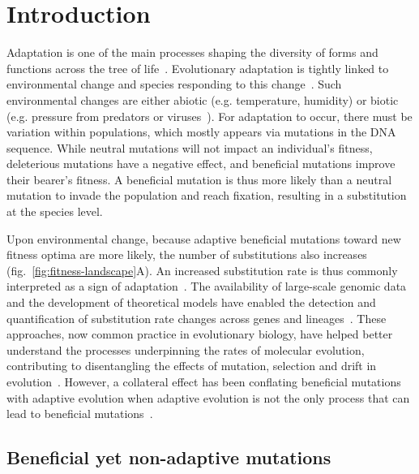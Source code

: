 \documentclass{article}
\begin{document}
    \section*{Introduction}
    Adaptation is one of the main processes shaping the diversity of forms and functions across the tree of life~\cite{darwin_origin_1859}.
    Evolutionary adaptation is tightly linked to environmental change and species responding to this change~\cite{merrell_adaptive_1994, gavrilets_adaptive_2009}.
    Such environmental changes are either abiotic (e.g. temperature, humidity) or biotic (e.g. pressure from predators or viruses~\cite{enard_viruses_2016}).
    For adaptation to occur, there must be variation within populations, which mostly appears via mutations in the DNA sequence.
    While neutral mutations will not impact an individual's fitness, deleterious mutations have a negative effect, and beneficial mutations improve their bearer's fitness.
    A beneficial mutation is thus more likely than a neutral mutation to invade the population and reach fixation, resulting in a substitution at the species level.

    Upon environmental change, because adaptive beneficial mutations toward new fitness optima are more likely, the number of substitutions also increases (fig.~\ref{fig:fitness-landscape}A).
    An increased substitution rate is thus commonly interpreted as a sign of adaptation~\cite{mcdonald_adaptative_1991, smith_adaptive_2002, welch_estimating_2006}.
    The availability of large-scale genomic data and the development of theoretical models have enabled the detection and quantification of substitution rate changes across genes and lineages~\cite{yang_statistical_2000, eyre-walker_genomic_2006, moutinho_variation_2019}.
    These approaches, now common practice in evolutionary biology, have helped better understand the processes underpinning the rates of molecular evolution, contributing to disentangling the effects of mutation, selection and drift in evolution~\cite{lynch_mutation_2023}.
    However, a collateral effect has been conflating beneficial mutations with adaptive evolution when adaptive evolution is not the only process that can lead to beneficial mutations~\cite{charlesworth_other_2007, mustonen_fitness_2009, jones_shifting_2017}.

    \subsection*{Beneficial yet non-adaptive mutations}
\end{document}
